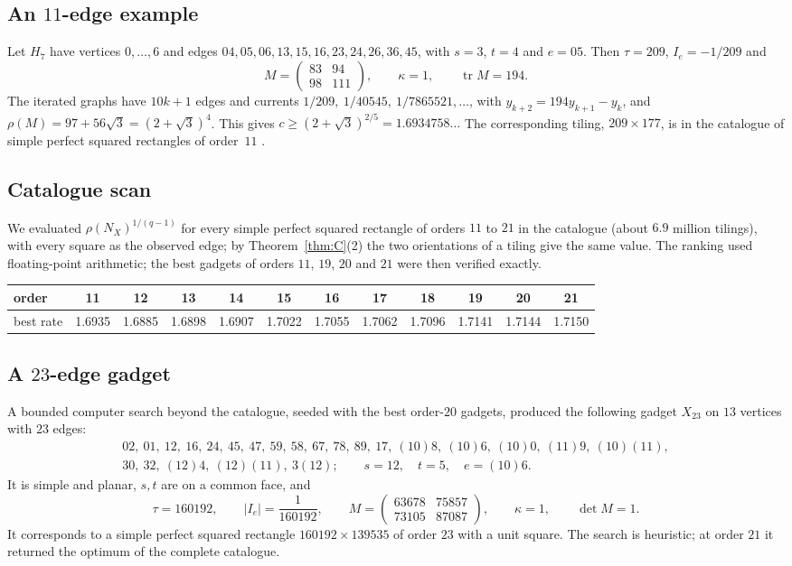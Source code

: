 \documentclass[11pt]{amsart}
\theoremstyle{plain}
\theoremstyle{definition}
\theoremstyle{remark}
\begin{document}
\subsection*{An $11$-edge example}
Let $H_7$ have vertices $0,\dots,6$ and edges
$04,05,06,13,15,16,23,24,26,36,45$, with $s=3$, $t=4$ and $e=05$. Then $\tau=209$, $I_e=-1/209$ and
\[
M=\begin{pmatrix}83&94\\98&111\end{pmatrix},\qquad\kappa=1,\qquad \operatorname{tr}M=194 .
\]
The iterated graphs have $10k+1$ edges and currents $1/209,\ 1/40545,\ 1/7865521,\dots$, with
$y_{k+2}=194y_{k+1}-y_k$, and $\rho(M)=97+56\sqrt3=(2+\sqrt3)^4$. This gives
$c\ge(2+\sqrt3)^{2/5}=1.6934758\ldots$ The corresponding tiling, $209\times177$, is in the catalogue of simple
perfect squared rectangles of order~$11$ \cite{Anderson}.

\subsection*{Catalogue scan}
We evaluated $\rho(N_X)^{1/(q-1)}$ for every simple perfect squared rectangle of orders $11$ to $21$ in the
catalogue \cite{Anderson} (about $6.9$ million tilings), with every square as the observed edge; by
Theorem~\ref{thm:C}(2) the two orientations of a tiling give the same value. The ranking used floating-point
arithmetic; the best gadgets of orders $11$, $19$, $20$ and $21$ were then
verified exactly.
\begin{center}
\small
\begin{tabular}{lccccccccccc}
\toprule
order&11&12&13&14&15&16&17&18&19&20&21\\
\midrule
best rate&1.6935&1.6885&1.6898&1.6907&1.7022&1.7055&1.7062&1.7096&1.7141&1.7144&1.7150\\
\bottomrule
\end{tabular}
\end{center}

\subsection*{A $23$-edge gadget}
A bounded computer search beyond the catalogue, seeded with the best order-$20$ gadgets, produced the following
gadget $X_{23}$ on $13$ vertices with $23$ edges:
\begin{gather*}
02,\ 01,\ 12,\ 16,\ 24,\ 45,\ 47,\ 59,\ 58,\ 67,\ 78,\ 89,\ 17,\ (10)8,\ (10)6,\ (10)0,\ (11)9,\ (10)(11),\\
30,\ 32,\ (12)4,\ (12)(11),\ 3(12);\qquad s=12,\quad t=5,\quad e=(10)6 .
\end{gather*}
It is simple and planar, $s,t$ are on a common face, and
\[
\tau=160192,\qquad |I_e|=\frac1{160192},\qquad M=\begin{pmatrix}63678&75857\\73105&87087\end{pmatrix},
\qquad\kappa=1,\qquad\det M=1 .
\]
It corresponds to a simple perfect squared rectangle $160192\times139535$ of order $23$ with a unit square. The
search is heuristic; at order $21$ it returned the optimum of the complete catalogue.
\end{document}
